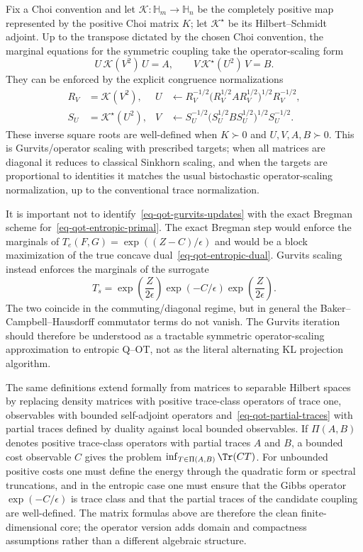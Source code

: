 Fix a Choi convention and let $\mathcal K:\mathbb H_m\to\mathbb H_n$ be the completely positive map represented by the positive Choi matrix $K$; let $\mathcal K^\star$ be its Hilbert--Schmidt adjoint. Up to the transpose dictated by the chosen Choi convention, the marginal equations for the symmetric coupling take the operator-scaling form
\[
	U\,\mathcal K(V^2)\,U=A,
	\qquad
	V\,\mathcal K^\star(U^2)\,V=B.
\]
They can be enforced by the explicit congruence normalizations
\begin{equation}\label{eq-qot-gurvits-updates}
\begin{aligned}
	R_V&=\mathcal K(V^2),
	&
	U&\leftarrow
	R_V^{-1/2}\bigl(R_V^{1/2} A R_V^{1/2}\bigr)^{1/2}R_V^{-1/2},
	\\
	S_U&=\mathcal K^\star(U^2),
	&
	V&\leftarrow
	S_U^{-1/2}\bigl(S_U^{1/2} B S_U^{1/2}\bigr)^{1/2}S_U^{-1/2}.
\end{aligned}
\end{equation}
These inverse square roots are well-defined when $K\succ0$ and $U,V,A,B\succ0$. This is Gurvits/operator scaling with prescribed targets; when all matrices are diagonal it reduces to classical Sinkhorn scaling, and when the targets are proportional to identities it matches the usual bistochastic operator-scaling normalization, up to the conventional trace normalization.


It is important not to identify~\eqref{eq-qot-gurvits-updates} with the exact Bregman scheme for~\eqref{eq-qot-entropic-primal}. The exact Bregman step would enforce the marginals of $T_e(F,G)=\exp((Z-C)/\epsilon)$ and would be a block maximization of the true concave dual~\eqref{eq-qot-entropic-dual}. Gurvits scaling instead enforces the marginals of the surrogate
\[
	T_s=
	\exp\!\left(\frac{Z}{2\epsilon}\right)
	\exp(-C/\epsilon)
	\exp\!\left(\frac{Z}{2\epsilon}\right).
\]
The two coincide in the commuting/diagonal regime, but in general the Baker--Campbell--Hausdorff commutator terms do not vanish. The Gurvits iteration should therefore be understood as a tractable symmetric operator-scaling approximation to entropic Q--OT, not as the literal alternating KL projection algorithm.

\begin{rem}
	The same definitions extend formally from matrices to separable Hilbert spaces by replacing density matrices with positive trace-class operators of trace one, observables with bounded self-adjoint operators and~\eqref{eq-qot-partial-traces} with partial traces defined by duality against local bounded observables. If $\Pi(A,B)$ denotes positive trace-class operators with partial traces $A$ and $B$, a bounded cost observable $C$ gives the problem $\inf_{T\in\Pi(A,B)}\Tr(CT)$. For unbounded positive costs one must define the energy through the quadratic form or spectral truncations, and in the entropic case one must ensure that the Gibbs operator $\exp(-C/\epsilon)$ is trace class and that the partial traces of the candidate coupling are well-defined. The matrix formulas above are therefore the clean finite-dimensional core; the operator version adds domain and compactness assumptions rather than a different algebraic structure.
\end{rem}
